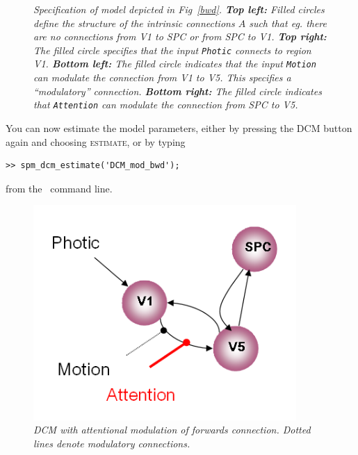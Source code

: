 \begin{figure}
\begin{center}
\caption{\em Specification of model depicted in Fig~\ref{bwd}. \textbf{Top left:} Filled circles define the structure of the intrinsic connections $A$ such that eg. there are no connections from V1 to SPC or from SPC to V1. \textbf{Top right:} The filled circle specifies that the input \texttt{Photic} connects to region V1. \textbf{Bottom left:} The filled circle indicates that the input \texttt{Motion} can modulate the connection from V1 to V5. This specifies a ``modulatory'' connection. \textbf{Bottom right:} The filled circle indicates that \texttt{Attention} can modulate the connection from SPC to V5. \label{dcm_fig4}}
\end{center}
\end{figure}

You can now estimate the model parameters, either by pressing the DCM button again and choosing \textsc{estimate}, or by typing
\begin{verbatim}
>> spm_dcm_estimate('DCM_mod_bwd');
\end{verbatim}
from the \matlab\ command line.

\begin{figure}
\begin{center}
\includegraphics[width=100mm]{dcm/dcm_mod_fwd}
\caption{\em DCM with attentional modulation of forwards connection. Dotted lines denote modulatory connections.\label{fwd}}
\end{center}
\end{figure}

